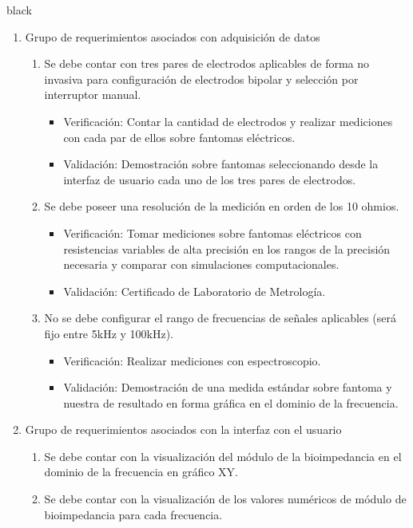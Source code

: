 \documentclass[11pt]{charter}
\begin{document}
\begin{consigna}{black}
\begin{enumerate}
\item Grupo de requerimientos asociados con adquisición de datos
	\begin{enumerate}
	\item Se debe contar con tres pares de electrodos aplicables de forma no invasiva para configuración de electrodos bipolar y selección por interruptor manual.
	\begin{itemize}
		\item Verificación: Contar la cantidad de electrodos y realizar mediciones con cada par de ellos sobre fantomas eléctricos. 
		\item Validación: Demostración sobre fantomas seleccionando desde la interfaz de usuario cada uno de los tres pares de electrodos.\\
	\end{itemize}	
	\item Se debe poseer una resolución de la medición en orden de los 10 ohmios.
	\begin{itemize}
		\item Verificación: Tomar mediciones sobre fantomas eléctricos con resistencias variables de alta precisión en los rangos de la precisión necesaria y comparar con simulaciones computacionales.
		\item Validación: Certificado de Laboratorio de Metrología.\\
	\end{itemize}
	\item No se debe configurar el rango de frecuencias de señales aplicables (será fijo entre 5kHz y 100kHz).
	\begin{itemize}
		\item Verificación: Realizar mediciones con espectroscopio.
		\item Validación: Demostración de una medida estándar sobre fantoma y nuestra de resultado en forma gráfica en el dominio de la frecuencia.\\
	\end{itemize}
	\end{enumerate}
\item Grupo de requerimientos asociados con la interfaz con el usuario
	\begin{enumerate}
	\item Se debe contar con la visualización del módulo de la bioimpedancia en el dominio de la frecuencia en gráfico XY.
	\item Se debe contar con la visualización de los valores numéricos de módulo de bioimpedancia para cada frecuencia.
\begin{itemize}

\end{itemize}
\end{enumerate}
\end{enumerate}
\end{consigna}
\end{document}
